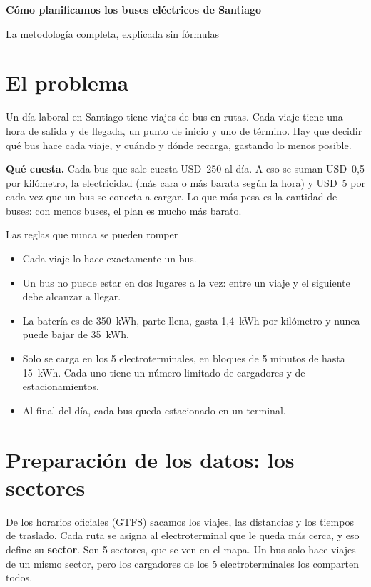 \documentclass[11pt,a4paper]{article}
\begin{document}
{\LARGE\bfseries\color{azul} Cómo planificamos los buses eléctricos de Santiago}\par
\vspace{2pt}
{\large\color{gris} La metodología completa, explicada sin fórmulas}\par
\vspace{4pt}

\section{El problema}
Un día laboral en Santiago tiene \TotalCorridas{} viajes de bus en \TotalRutas{} rutas. Cada viaje tiene una
hora de salida y de llegada, un punto de inicio y uno de término. Hay que decidir qué bus hace cada viaje, y
cuándo y dónde recarga, gastando lo menos posible.

\textbf{Qué cuesta.} Cada bus que sale cuesta USD~250 al día. A eso se suman USD~0,5 por kilómetro, la
electricidad (más cara o más barata según la hora) y USD~5 por cada vez que un bus se conecta a cargar.
Lo que más pesa es la cantidad de buses: con menos buses, el plan es mucho más barato.

\begin{caja}{Las reglas que nunca se pueden romper}
\begin{itemize}
  \item Cada viaje lo hace exactamente un bus.
  \item Un bus no puede estar en dos lugares a la vez: entre un viaje y el siguiente debe alcanzar a llegar.
  \item La batería es de 350~kWh, parte llena, gasta 1,4~kWh por kilómetro y nunca puede bajar de 35~kWh.
  \item Solo se carga en los 5 electroterminales, en bloques de 5 minutos de hasta 15~kWh. Cada uno tiene
        un número limitado de cargadores y de estacionamientos.
  \item Al final del día, cada bus queda estacionado en un terminal.
\end{itemize}
\end{caja}

\section{Preparación de los datos: los sectores}
De los horarios oficiales (GTFS) sacamos los viajes, las distancias y los tiempos de traslado. Cada ruta se
asigna al electroterminal que le queda más cerca, y eso define su \textbf{sector}. Son 5 sectores, que se
ven en el mapa. Un bus solo hace viajes de un mismo sector, pero los cargadores de los 5 electroterminales
los comparten todos.
\end{document}
